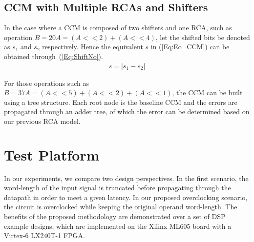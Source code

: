 \documentclass[prodmode,acmtrets]{acmsmall} %
\begin{document}
\subsection{CCM with Multiple RCAs and Shifters}\label{CCM_Multi}
In the case where a CCM is composed of two shifters and one RCA, such as operation $B=20A=(A<<2)+(A<<4)$, let the shifted bits be denoted as $s_1$ and $s_2$ respectively. Hence the equivalent $s$ in (\ref{Eq:Eo_CCM}) can be obtained through~(\ref{Eq:ShiftNo}).
%
\begin{eqnarray}\label{Eq:ShiftNo}
  s=\left|s_1-s_2\right|
\end{eqnarray}

For those operations such as $B=37A=(A<<5)+(A<<2)+(A<<1)$, the CCM can be built using a tree structure. Each root node is the baseline CCM and the errors are propagated through an adder tree, of which the error can be determined based on our previous RCA model.

\section{Test Platform}\label{Section_ExpSetup}
In our experiments, we compare two design perspectives. In the first scenario, the word-length of the input signal is truncated before propagating through the datapath in order to meet a given latency. In our proposed overclocking scenario, the circuit is overclocked while keeping the original operand word-length. The benefits of the proposed methodology are demonstrated over a set of DSP example designs, which are implemented on the Xilinx ML605 board with a Virtex-6 LX240T-1 FPGA.
\end{document}
